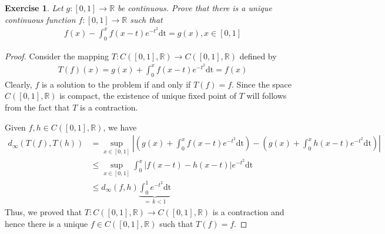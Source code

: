 \documentclass[12pt,leqno]{amsart}
\newtheorem{exercise}{Exercise}[section]
\theoremstyle{definition}
\numberwithin{equation}{subsection}
\begin{document}
\begin{exercise}
Let $g:[0,1]\to\mathbb{R}$ be continuous. Prove that there is a unique continuous function $f:[0,1]\to\mathbb{R}$ such that 
\begin{align*}
    f(x) - \int^x_0 f(x - t)e^{-t^2} \text{dt} = g(x), x\in [0,1]
\end{align*}
\end{exercise}
\begin{proof}
Consider the mapping $T:C([0,1],\mathbb{R})\to C([0,1],\mathbb{R})$ defined by 
\begin{align*}
    T(f)(x) = g(x) + \int^x_0 f(x - t)e^{-t^2} \text{dt} = f(x)
\end{align*}
Clearly, $f$ is a solution to the problem if and only if $T(f) = f$. Since the space $C([0,1],\mathbb{R})$ is compact, the existence of unique fixed point of $T$ will follows from the fact that $T$ is a contraction.

Given $f,h\in C([0,1],\mathbb{R})$, we have 
\begin{align*}
    d_\infty \left(T(f), T(h)\right)  & = \sup_{x\in[0,1]} \left|\left(g(x) + \int^x_0 f(x - t)e^{-t^2} \text{dt}\right) -  \left(g(x) + \int^x_0 h(x - t)e^{-t^2} \text{dt}\right)\right| \\
    & \leq \sup_{x\in[0,1]} \int^x_0 \left|f(x-t) - h(x-t)\right|e^{-t^2} \text{dt} \\
    & \leq d_\infty(f,h) \underbrace{\int^1_0 e^{-t^2} \text{dt}}_{=\, k < 1}
\end{align*}
Thus, we proved that $T:C([0,1],\mathbb{R})\to C([0,1],\mathbb{R})$ is a contraction and hence there is a unique $f\in C([0,1],\mathbb{R})$ such that $T(f) = f$.
\end{proof}

\medskip
\end{document}
